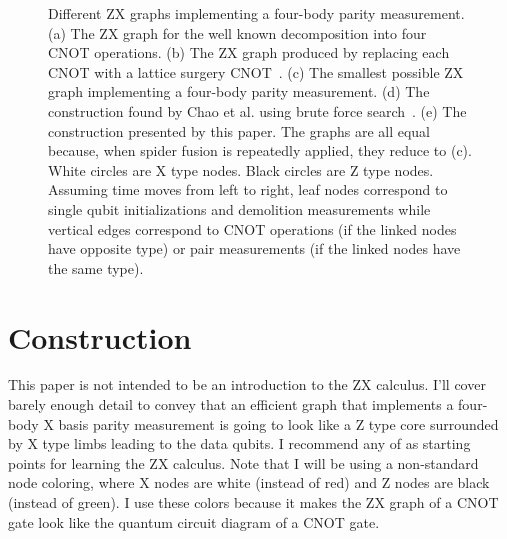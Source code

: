 \documentclass[onecolumn,unpublished,a4paper]{quantumarticle}
\theoremstyle{definition}
\theoremstyle{definition}
\theoremstyle{definition}
\begin{document}
\begin{figure}
    \centering
    \caption{
        Different ZX graphs implementing a four-body parity measurement.
        (a) The ZX graph for the well known decomposition into four CNOT operations.
        (b) The ZX graph produced by replacing each CNOT with a lattice surgery CNOT~\cite{horsman2012latticesurgery}.
        (c) The smallest possible ZX graph implementing a four-body parity measurement.
        (d) The construction found by Chao et al. using brute force search~\cite{chao2020optimization}.
        (e) The construction presented by this paper.
        The graphs are all equal because, when spider fusion is repeatedly applied, they reduce to (c).
        White circles are X type nodes.
        Black circles are Z type nodes.
        Assuming time moves from left to right, leaf nodes correspond to single qubit initializations and demolition measurements while vertical edges correspond to CNOT operations (if the linked nodes have opposite type) or pair measurements (if the linked nodes have the same type).
    }
    \label{fig:zx_identities}
\end{figure}

\section{Construction}
\label{sec:construction}

This paper is not intended to be an introduction to the ZX calculus.
I'll cover barely enough detail to convey that an efficient graph that implements a four-body X basis parity measurement is going to look like a Z type core surrounded by X type limbs leading to the data qubits.
I recommend any of \cite{backens2016simplifiedzx,de2017zx,coecke2017picturing} as starting points for learning the ZX calculus.
Note that I will be using a non-standard node coloring, where X nodes are white (instead of red) and Z nodes are black (instead of green).
I use these colors because it makes the ZX graph of a CNOT gate look like the quantum circuit diagram of a CNOT gate.
\end{document}
